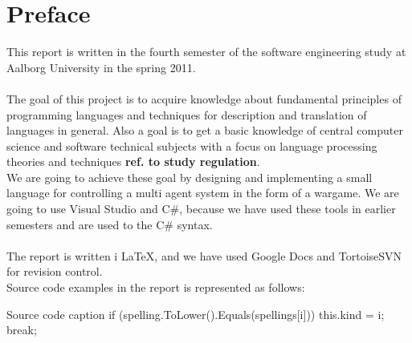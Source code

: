 \chapter*{Preface}
This report is written in the fourth semester of the software engineering study at Aalborg University in the spring 2011.
\\
\\
The goal of this project is to acquire knowledge about fundamental principles of programming languages and techniques for description and translation of languages in general. Also a goal is to get a basic knowledge of central computer science and software technical subjects with a focus on language processing theories and techniques \textbf{ref. to study regulation}.\\
  We are going to achieve these goal by designing and implementing a small language for controlling a multi agent system in the form of a wargame. We are going to use Visual Studio and C\#, because we have used these tools in earlier semesters and are used to the C\# syntax.
	\\
	\\
	The report is written i \LaTeX, and we have used Google Docs and TortoiseSVN for revision control.
	\\

Source code examples in the report is represented as follows:
\begin{source}{}{Source code caption}{}
if (spelling.ToLower().Equals(spellings[i]))
	{
		this.kind = i;
		break;
	}
\end{source}